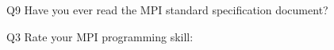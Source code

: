 \begin{description}%
\item{Q9} Have you ever read the MPI standard specification document?%
\item{Q3} Rate your MPI programming skill:%
\end{description}%
